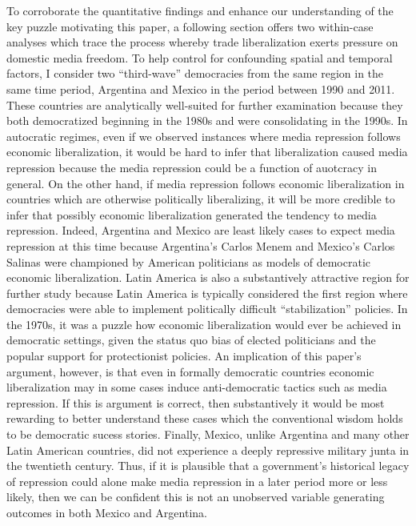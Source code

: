 \documentclass[12pt]{report}
\begin{document}
To corroborate the quantitative findings and enhance our understanding of the key puzzle motivating
this paper, a following section offers two within-case analyses which trace the process whereby
trade liberalization exerts pressure on domestic media freedom. To help control for confounding
spatial and temporal factors, I consider two ``third-wave'' democracies from the same region in the
same time period, Argentina and Mexico in the period between 1990 and 2011. These countries are
analytically well-suited for further examination because they both democratized beginning in the
1980s and were consolidating in the 1990s. In autocratic regimes, even if we observed instances
where media repression follows economic liberalization, it would be hard to infer that
liberalization caused media repression because the media repression could be a function of auotcracy
in general. On the other hand, if media repression follows economic liberalization in countries
which are otherwise politically liberalizing, it will be more credible to infer that possibly
economic liberalization generated the tendency to media repression. Indeed, Argentina and Mexico are
least likely cases to expect media repression at this time because Argentina's Carlos Menem and
Mexico's Carlos Salinas were championed by American politicians as models of democratic economic
liberalization. Latin America is also a substantively attractive region for further study because
Latin America is typically considered the first region where democracies were able to implement
politically difficult ``stabilization'' policies. In the 1970s, it was a puzzle how economic
liberalization would ever be achieved in democratic settings, given the status quo bias of elected
politicians and the popular support for protectionist policies. An implication of this paper's
argument, however, is that even in formally democratic countries economic liberalization may in some
cases induce anti-democratic tactics such as media repression. If this is argument is correct, then
substantively it would be most rewarding to better understand these cases which the conventional
wisdom holds to be democratic sucess stories. Finally, Mexico, unlike Argentina and many other Latin
American countries, did not experience a deeply repressive military junta in the twentieth century.
Thus, if it is plausible that a government's historical legacy of repression could alone make media
repression in a later period more or less likely, then we can be confident this is not an unobserved
variable generating outcomes in both Mexico and Argentina.
\end{document}
